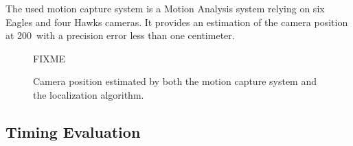 The used motion capture system is a Motion Analysis system relying on
six Eagles and four Hawks cameras. It provides an estimation of the
camera position at 200\hertz~with a precision error less than one
centimeter.


\begin{figure}[ht!]
  \begin{center}
    FIXME
  \end{center}
  \caption{Camera position estimated by both the motion capture system
    and the localization algorithm. \label{tab:mocap_comparison}}
\end{figure}

\subsection{Timing Evaluation}\label{sec:timing}
